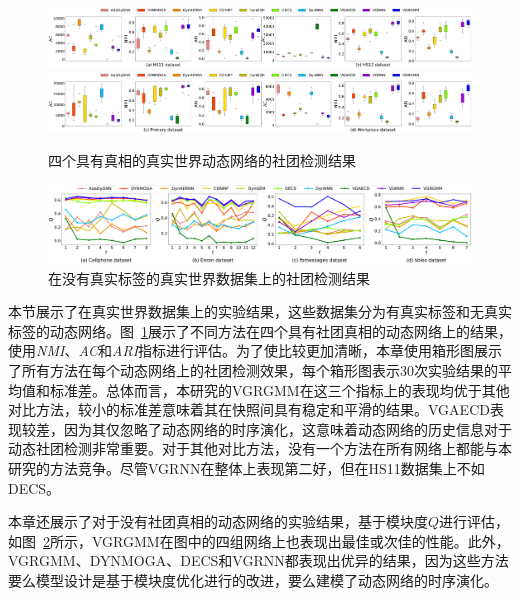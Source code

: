 \begin{figure}[htbp]
    \centering

    \includegraphics[width=1\textwidth]{figures/chap06/chap5realDataGHS-box.pdf}
    \includegraphics[width=1\textwidth]{figures/chap06/chap5realDataGpw-box.pdf}
    \caption{四个具有真相的真实世界动态网络的社团检测结果}
    \label{fig:realnet}
    \vspace{0cm}
\end{figure}

\begin{figure}[htbp]
    \centering
    \includegraphics[width=1\textwidth]{figures/chap06/chap5realDataNG.pdf}
    \caption{在没有真实标签的真实世界数据集上的社团检测结果}
    \label{fig:noTruth}
    \vspace{0cm}
\end{figure}

本节展示了在真实世界数据集上的实验结果，这些数据集分为有真实标签和无真实标签的动态网络。图~\ref{fig:realnet}展示了不同方法在四个具有社团真相的动态网络上的结果，使用\emph{NMI}、\emph{AC}和\emph{ARI}指标进行评估。为了使比较更加清晰，本章使用箱形图展示了所有方法在每个动态网络上的社团检测效果，每个箱形图表示$30$次实验结果的平均值和标准差。总体而言，本研究的VGRGMM在这三个指标上的表现均优于其他对比方法，较小的标准差意味着其在快照间具有稳定和平滑的结果。VGAECD表现较差，因为其仅忽略了动态网络的时序演化，这意味着动态网络的历史信息对于动态社团检测非常重要。对于其他对比方法，没有一个方法在所有网络上都能与本研究的方法竞争。尽管VGRNN在整体上表现第二好，但在HS11数据集上不如DECS。

本章还展示了对于没有社团真相的动态网络的实验结果，基于模块度$Q$进行评估，如图~\ref{fig:noTruth}所示，VGRGMM在图中的四组网络上也表现出最佳或次佳的性能。此外，VGRGMM、DYNMOGA、DECS和VGRNN都表现出优异的结果，因为这些方法要么模型设计是基于模块度优化进行的改进，要么建模了动态网络的时序演化。


